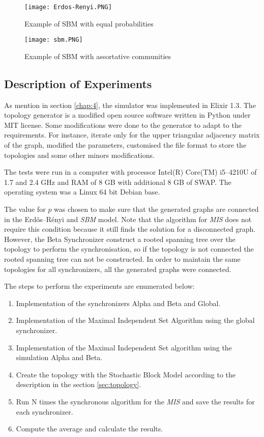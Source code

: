 \begin{figure}[ht]
\centering
\texttt{[image: Erdos-Renyi.PNG]} 
\caption{Example of SBM with equal probabilities}
\label{fig:erdos}
\end{figure}

\begin{figure}[ht]
\centering
\texttt{[image: sbm.PNG]} 
\caption{Example of SBM with assortative communities}
\label{fig:sbm}
\end{figure}

\subsection{Description of Experiments}

As mention in section \ref{chap:4}, the simulator was implemented in Elixir 1.3. The topology generator is a modified open source software written in Python under MIT license. Some modifications were done to the generator to adapt to the requirements. For instance, iterate only for the upper triangular adjacency matrix of the graph, modified the parameters, customised the file format to store the topologies and some other minors modifications.

The tests were run in a computer with processor Intel(R) Core(TM) i5--4210U of 1.7 and 2.4 GHz and RAM of 8 GB with additional 8 GB of SWAP. The operating system was a Linux 64 bit Debian base.


The value for $p$ was chosen to make sure that the generated graphs are connected in the Erd\~os--R\'enyi and \textit{SBM} model. Note that the algorithm for \textit{MIS} does not require this condition because it still finds the solution for a disconnected graph. However, the Beta Synchronizer construct a rooted spanning tree over the topology to perform the synchronisation, so if the topology is not connected the rooted spanning tree can not be constructed. In order to maintain the same topologies for all synchronizers, all the generated graphs were connected.  

The steps to perform the experiments are enumerated below:

\begin{enumerate}
\item Implementation of the synchronizers Alpha and Beta and Global.
\item Implementation of the Maximal Independent Set Algorithm using the global synchronizer.
\item Implementation of the Maximal Independent Set algorithm using the simulation Alpha and Beta.
\item Create the topology with the Stochastic Block Model according to the description in the section \ref{sec:topology}.
\item Run N times the synchronous algorithm for the \textit{MIS} and save the results for each synchronizer.
\item Compute the average and calculate the results.
\end{enumerate}



